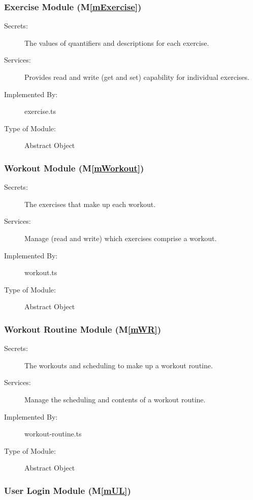 \documentclass[12pt, titlepage]{article}
\newcommand{\mref}[1]{M\ref{#1}}
\begin{document}
\subsubsection{Exercise Module (\mref{mExercise})}

\begin{description}
\item[Secrets:] The values of quantifiers and descriptions for each exercise.
\item[Services:] Provides read and write (get and set) capability for individual exercises.
\item[Implemented By:] exercise.ts
\item[Type of Module:] Abstract Object
\end{description}

\subsubsection{Workout Module (\mref{mWorkout})}

\begin{description}
\item[Secrets:] The exercises that make up each workout.
\item[Services:] Manage (read and write) which exercises comprise a workout.
\item[Implemented By:] workout.ts
\item[Type of Module:] Abstract Object
\end{description}

\subsubsection{Workout Routine Module (\mref{mWR})}

\begin{description}
\item[Secrets:] The workouts and scheduling to make up a workout routine.
\item[Services:] Manage the scheduling and contents of a workout routine.
\item[Implemented By:] workout-routine.ts
\item[Type of Module:] Abstract Object
\end{description}

\subsubsection{User Login Module (\mref{mUL})}
\end{document}
